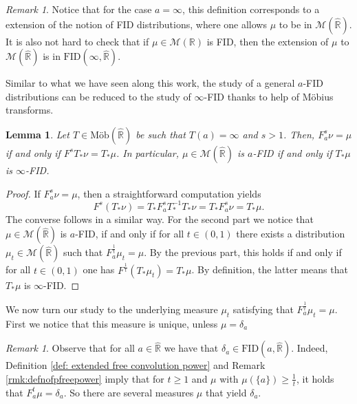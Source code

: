 \documentclass[reqno,11pt]{amsart}
\newtheorem{lemma}[theorem]{Lemma}
\theoremstyle{remark}
\newtheorem{remark}[theorem]{Remark}
\newcommand{\rr}{\mathbb{R}}
\newcommand{\MM}{\mathcal{M}}
\newcommand{\freepower}[1]{F^{#1}}
\newcommand{\pfreepower}[2]{F_{#1}^{#2}}
\newcommand{\mobr}{\text{Möb}(\hat{\rr})}
\begin{document}
\begin{remark}
Notice that for the case $a=\infty$, this definition corresponds to a extension of the notion of FID distributions, where one allows $\mu$ to be in $\MM(\hat{\rr})$. It is also not hard to check that if $\mu\in\MM(\rr)$ is FID, then the extension of $\mu$ to $\MM(\hat{\rr})$ is in $\text{FID}(\infty,\hat{\rr})$. 
\end{remark}


Similar to what we have seen along this work, the study of a general $a$-FID distributions can be reduced to the study of $\infty$-FID thanks to help of Möbius transforms.

\begin{lemma}
\label{lem:FIDa.reduction.to.FID}
Let $T\in \mobr$ be such that $T(a) =\infty$ and $s > 1$. Then, $ \pfreepower{a}{s}\nu = \mu $ if and only if  $ \freepower{s} T_*\nu= T_*\mu$. In particular, $ \mu \in \MM(\hat{\rr}) $ is $a$-FID if and only if $ T_*\mu $ is $\infty$-FID.
\end{lemma}

\begin{proof}
If $ \pfreepower{a}{s}\nu = \mu $, then a straightforward computation yields
$$ \freepower{s} (T_*\nu)=   T_*\pfreepower{a}{s}T_*^{-1}T_*\nu = T_*\pfreepower{a}{s}\nu = T_*\mu.$$
The converse follows in a similar way. For the second part we notice that $ \mu \in \MM(\hat{\rr}) $ is $a$-FID, if and only if for all $t\in(0,1)$ there exists a distribution $ \mu_t \in  \MM(\hat{\rr}) $ such that $ \pfreepower{a}{\frac{1}{t}}\mu_t = \mu $. By the previous part, this holds if and only if for all $t\in(0,1)$ one has $ \freepower{\frac{1}{t}} (T_*\mu_t)= T_*\mu$. By definition, the latter means that $ T_*\mu $ is $\infty$-FID.
\end{proof}

We now turn our study to the underlying measure $\mu_t$ satisfying that $\pfreepower{a}{\frac{1}{t}} \mu_t=\mu$. First we notice that this measure is unique, unless $\mu=\delta_a$

\begin{remark}
Observe that for all $a\in \hat{\rr}$ we have that $\delta_a \in \text{FID}(a,\hat{\rr})$. Indeed, Definition \ref{def: extended free convolution power} and Remark \ref{rmk:defnofpfreepower} imply that for $t\geq 1$ and $\mu$ with $ \mu(\{a\})\geq \frac{1}{t} $, it holds that $ \pfreepower{a}{t}\mu=\delta_a $. So there are several measures $\mu$ that yield $\delta_a$. 
\end{remark}
\end{document}
